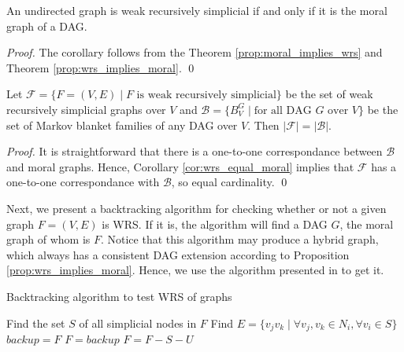 \begin{corollary}
\label{cor:wrs_equal_moral}
An undirected graph is weak recursively simplicial if and only if it is the moral graph of a DAG. 
\end{corollary}
\begin{proof}
The corollary follows from the Theorem \ref{prop:moral_implies_wrs} and Theorem \ref{prop:wrs_implies_moral}. \qed
\end{proof}

\begin{corollary}
Let $\mathcal{F}=\{F=(V,E) \mid F \text{ is weak recursively simplicial}\}$ be the set of weak recursively simplicial graphs over $V$ and $\mathcal{B} = \{B_V^G \mid \text{for all DAG $G$ over $V$}\}$ be the set of Markov blanket families of any DAG over $V$. Then $|\mathcal{F}| = |\mathcal{B}|$. 
\end{corollary}
\begin{proof}
It is straightforward that there is a one-to-one correspondance between $\mathcal{B}$ and moral graphs. Hence, Corollary \ref{cor:wrs_equal_moral} implies that $\mathcal{F}$ has a one-to-one correspondance with $\mathcal{B}$, so equal cardinality. \qed
\end{proof}

Next, we present a backtracking algorithm for checking whether or not a given graph $F=(V,E)$ is WRS. If it is, the algorithm will find a DAG $G$, the moral graph of whom is $F$. Notice that this algorithm may produce a hybrid graph, which always has a consistent DAG extension according to Proposition \ref{prop:wrs_implies_moral}. Hence, we use the algorithm presented in \cite{dor1992simple} to get it. 
\begin{algorithm}[]
\caption{Backtracking algorithm to test WRS of graphs}
\label{alg:wrs_bktr}
\begin{algorithmic}[]
    \Statex
    \EndIf
    \State Find the set $S$ of all simplicial nodes in $F$
    	\State Find $E=\{v_jv_k \mid \forall v_j, v_k \in N_i, \forall v_i \in S\}$
    	\State $backup = F$
    	 
    	\State $F=backup$
    	\State $F=F-S-U$ 
        \EndIf
      \EndFor
    \EndIf
    \State {}
    \EndFunction
\end{algorithmic}
\end{algorithm}


